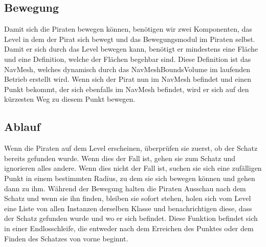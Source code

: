 \documentclass[
	12pt, %
	a4paper,
	listof=totoc, %
	bibliography=totoc, %
	numbers=noenddot, %
	ngerman, %
	headsepline, %
	oneside %
	]{scrbook} %
\begin{document}
\subsection{Bewegung}
Damit sich die Piraten bewegen können, benötigen wir zwei Komponenten, das Level in dem der Pirat sich bewegt und das Bewegungsmodul im Piraten selbst. Damit er sich durch das Level bewegen kann, benötigt er mindestens eine Fläche und eine Definition, welche der Flächen begehbar sind. Diese Definition ist das \gls{NavMesh}, welches dynamisch durch das NavMeshBoundsVolume im laufenden Betrieb erstellt wird. Wenn sich der Pirat nun im \gls{NavMesh} befindet und einen Punkt bekommt, der sich ebenfalls im \gls{NavMesh} befindet, wird er sich auf den kürzesten Weg  zu diesem Punkt bewegen.

\subsection{Ablauf}
Wenn die Piraten auf dem Level erscheinen, überprüfen sie zuerst, ob der Schatz bereits gefunden wurde. Wenn dies der Fall ist, gehen sie zum Schatz und ignorieren alles andere. Wenn dies nicht der Fall ist, suchen sie sich eine zufälligen Punkt in einem bestimmten Radius, zu dem sie sich bewegen können und gehen dann zu ihm. Während der Bewegung halten die Piraten Ausschau nach dem Schatz und wenn sie ihn finden, bleiben sie sofort stehen, holen sich vom Level eine Liste von allen Instanzen derselben Klasse und benachrichtigen diese, dass der Schatz gefunden wurde und wo er sich befindet.
Diese Funktion befindet sich in einer Endlosschleife, die entweder nach dem Erreichen des Punktes oder dem Finden des Schatzes von vorne beginnt.
\end{document}
